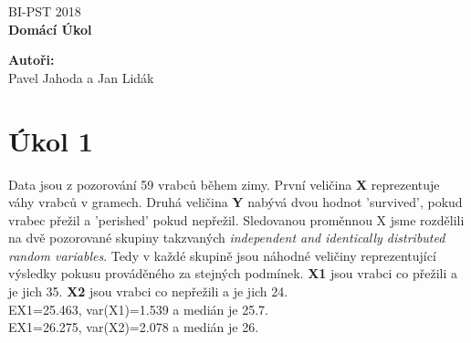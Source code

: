 \documentclass[12pt,a4paper]{article}
\begin{document}
\begin{titlepage}
  \thispagestyle{fancy}

  \vspace*{\fill}
  \begin{center}
    {\fontsize{20}{30}\selectfont BI-PST 2018}\\[1cm]
    {\fontsize{30}{100}\selectfont \textbf{Domácí Úkol}}\\[4.2cm]
  \end{center}

  \vspace*{\fill}

  {\fontsize{10}{10} \selectfont \noindent
  \textbf{Autoři:}\\
  Pavel Jahoda a Jan Lidák
  }
\end{titlepage}

\section{Úkol 1}
Data jsou z pozorování 59 vrabců během zimy. První veličina {\bf X} reprezentuje váhy vrabců v gramech. Druhá veličina {\bf Y} nabývá dvou hodnot 'survived', pokud vrabec přežil a 'perished' pokud nepřežil. Sledovanou proměnnou X jsme rozdělili na dvě pozorované skupiny takzvaných \textit{independent and identically distributed random variables}. Tedy v každé skupině jsou náhodné veličiny reprezentující výsledky pokusu prováděného za stejných podmínek.  {\bf X1} jsou vrabci co přežili a je jich 35. {\bf X2} jsou vrabci co nepřežili a je jich 24.\\
EX1=25.463, var(X1)=1.539 a medián je 25.7.\\
EX1=26.275, var(X2)=2.078 a medián je 26.\\
\par \bigskip
\end{document}
